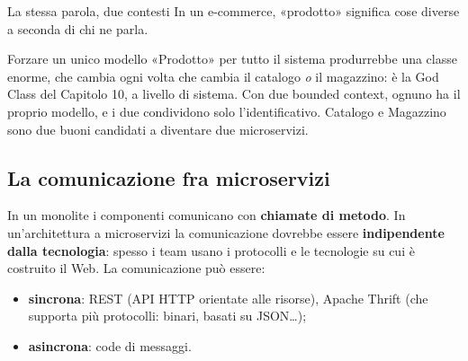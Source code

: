 \begin{esempio}{La stessa parola, due contesti}
In un e-commerce, «prodotto» significa cose diverse a seconda di chi ne parla.

\begin{center}
\end{center}
Forzare un unico modello «Prodotto» per tutto il sistema produrrebbe una classe enorme, che cambia ogni volta che cambia
il catalogo \textit{o} il magazzino: è la God Class del Capitolo 10, a livello di sistema. Con due bounded context, ognuno
ha il proprio modello, e i due condividono solo l'identificativo. Catalogo e Magazzino sono due buoni candidati a diventare
due microservizi.
\end{esempio}

\subsection{La comunicazione fra microservizi}

In un monolite i componenti comunicano con \textbf{chiamate di metodo}. In un'architettura a microservizi la comunicazione
dovrebbe essere \textbf{indipendente dalla tecnologia}: spesso i team usano i protocolli e le tecnologie su cui è costruito
il Web. La comunicazione può essere:
\begin{itemize}
  \item \textbf{sincrona}: REST (API HTTP orientate alle risorse), Apache Thrift (che supporta più protocolli: binari,
        basati su JSON\ldots);
  \item \textbf{asincrona}: code di messaggi.
\end{itemize}

